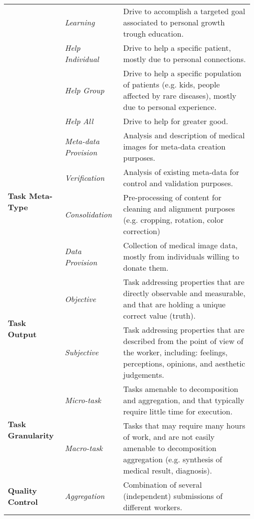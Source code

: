 \documentclass[10pt,twocolumn,letterpaper]{article}
\begin{document}
\begin{table*}
\begin{tabular}{lm{75px}m{320px}}
									 	& \textit{Learning} &  Drive to accomplish a targeted goal associated to personal growth trough education. \\ \cline{2-3}		
									 	& \textit{Help Individual} & Drive to help a specific patient, mostly due to personal connections. \\\cline{2-3}									
										& \textit{Help Group} & Drive to help a specific population of patients (e.g. kids, people affected by rare diseases), mostly due to personal experience. \\ \cline{2-3}									
									 	& \textit{Help All} & Drive to help for greater good.   \\
		\midrule		 
		\multirow{4}{*}{\textbf{Task Meta-Type}} & \textit{Meta-data Provision} & Analysis and description of medical images for meta-data creation purposes. \\	\cline{2-3}
									 	& \textit{Verification} & Analysis of existing meta-data for control and validation purposes. \\	\cline{2-3}									
									 	& \textit{Consolidation} & Pre-processing of content for cleaning and alignment purposes (e.g. cropping, rotation, color correction) \\	\cline{2-3}	
                    & \textit{Data Provision} & Collection of medical image data, mostly from individuals willing to donate them.\\
		\midrule		 
		\multirow{2}{*}{\textbf{Task Output}}		& \textit{Objective} & Task addressing properties that are directly observable and measurable, and that are holding a unique correct value (truth). \\ \cline{2-3}
									 	& \textit{Subjective} & Task addressing properties that are described from the point of view of the worker, including: feelings, perceptions, opinions, and aesthetic judgements. \\	
		\midrule		 
		\multirow{2}{*}{\textbf{Task Granularity}}	& \textit{Micro-task} & Tasks amenable to decomposition and aggregation, and that typically require little time for execution.\\ \cline{2-3}
									 	& \textit{Macro-task} & Tasks that may require many hours of work, and are not easily amenable to decomposition aggregation (e.g. synthesis of medical result, diagnosis). \\											
		\midrule	
		\multirow{7}{*}{\textbf{Quality Control}}	& \textit{Aggregation} & Combination of several (independent) submissions of different workers. \\ \cline{2-3}

\end{tabular}
\end{table*}
\end{document}
